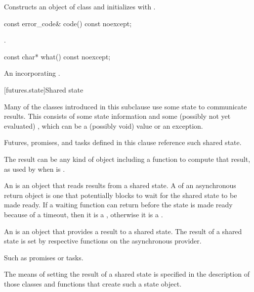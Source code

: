 \begin{itemdescr}
\pnum
\effects Constructs an object of class 
and initializes  with .
\end{itemdescr}

%
\begin{itemdecl}
const error_code& code() const noexcept;
\end{itemdecl}

\begin{itemdescr}
\pnum
\returns {}.
\end{itemdescr}

%
\begin{itemdecl}
const char* what() const noexcept;
\end{itemdecl}

\begin{itemdescr}
\pnum
\returns An \ntbs incorporating .
\end{itemdescr}

[futures.state]{Shared state}

\pnum
Many of the classes introduced in this subclause use some state to communicate results. This
 consists of some state information and some (possibly not
yet evaluated) , which can be a (possibly void) value or an exception. \begin{note}
Futures, promises, and tasks defined in this clause reference such shared state. \end{note}

\pnum
\begin{note} The result can be any kind of object including a function to compute that result,
as used by  when  is . \end{note}

\pnum
An  is an object that reads results from a
shared state. A  of an asynchronous return object is one
that potentially blocks to wait for the shared state to be made
ready.
If a waiting function can return before the state is made ready because of a
timeout, then it is a , otherwise
it is a .

\pnum
An  is an object that provides a result to a shared
state.
The result of a shared state is set by
respective functions on the asynchronous provider. \begin{note} Such as promises or tasks.
\end{note} The means of setting the result of a shared state is specified
in the description of those classes and functions that create such a state object.

